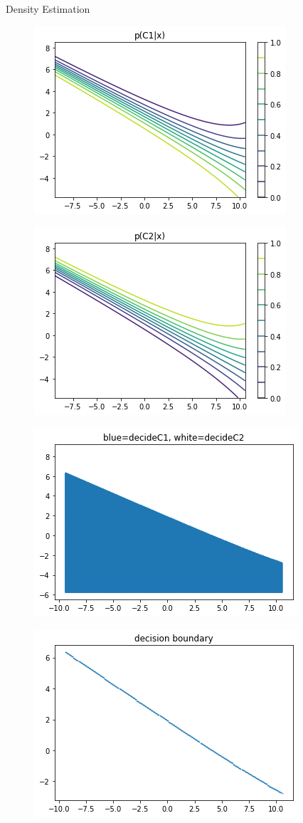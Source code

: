 \documentclass[
ngerman,
]{tudaexercise}
\begin{document}
\begin{task}{Density Estimation}
\begin{subtask}
\begin{figure}[H]
	\end{figure}
\begin{figure}[H]
		\includegraphics{pc1x.png}
\end{figure}
\begin{figure}[H]
	\includegraphics{pc2x.png}
\end{figure}
\begin{figure}[H]
	\includegraphics{dec1.png}
\end{figure}
\begin{figure}[H]
	\includegraphics{dec2.png}

\end{figure}
\end{subtask}
\end{task}
\end{document}

